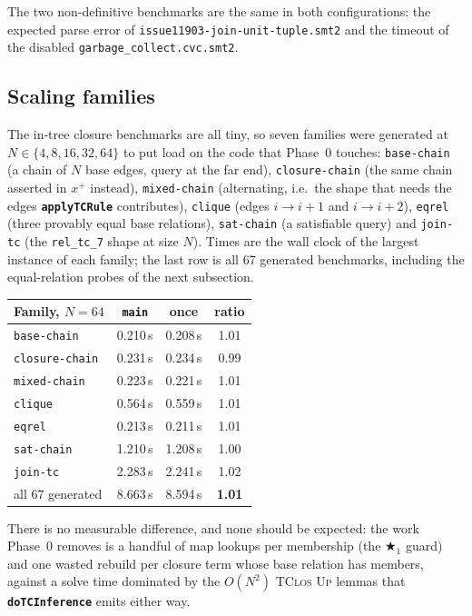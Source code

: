 \documentclass[11pt,a4paper]{article}
\newcommand{\code}[1]{\texttt{\small #1}}
\newcommand{\fn}[1]{\texttt{\small\bfseries #1}}
\newcommand{\tc}[1]{{#1}^{+}}
\theoremstyle{definition}
\begin{document}
\noindent
The two non-definitive benchmarks are the same in both configurations: the
expected parse error of \code{issue11903-join-unit-tuple.smt2} and the timeout
of the disabled \code{garbage\_collect.cvc.smt2}.

\subsection{Scaling families}

The in-tree closure benchmarks are all tiny, so seven families were generated at
$N \in \{4,8,16,32,64\}$ to put load on the code that Phase~0 touches:
\code{base-chain} (a chain of $N$ base edges, query at the far end),
\code{closure-chain} (the same chain asserted in $\tc{x}$ instead),
\code{mixed-chain} (alternating, i.e.\ the shape that needs the edges
\fn{applyTCRule} contributes), \code{clique} (edges $i\to i+1$ and $i\to i+2$),
\code{eqrel} (three provably equal base relations), \code{sat-chain} (a
satisfiable query) and \code{join-tc} (the \code{rel\_tc\_7} shape at size $N$).
Times are the wall clock of the largest instance of each family; the last row is
all 67 generated benchmarks, including the equal-relation probes of the next
subsection.

\begin{center}\small
\renewcommand{\arraystretch}{1.15}
\begin{tabular}{@{}lccc@{}}
\toprule
Family, $N=64$ & \code{main} & once & ratio\\
\midrule
\code{base-chain}    & 0.210\,s & 0.208\,s & 1.01\\
\code{closure-chain} & 0.231\,s & 0.234\,s & 0.99\\
\code{mixed-chain}   & 0.223\,s & 0.221\,s & 1.01\\
\code{clique}        & 0.564\,s & 0.559\,s & 1.01\\
\code{eqrel}         & 0.213\,s & 0.211\,s & 1.01\\
\code{sat-chain}     & 1.210\,s & 1.208\,s & 1.00\\
\code{join-tc}       & 2.283\,s & 2.241\,s & 1.02\\
\midrule
all 67 generated     & 8.663\,s & 8.594\,s & \textbf{1.01}\\
\bottomrule
\end{tabular}
\end{center}

\noindent
There is no measurable difference, and none should be expected: the work Phase~0
removes is a handful of map lookups per membership (the $\bigstar_1$ guard) and
one wasted rebuild per closure term whose base relation has members, against a
solve time dominated by the $O(N^2)$ \textsc{TClos Up} lemmas that
\fn{doTCInference} emits either way.
\end{document}
